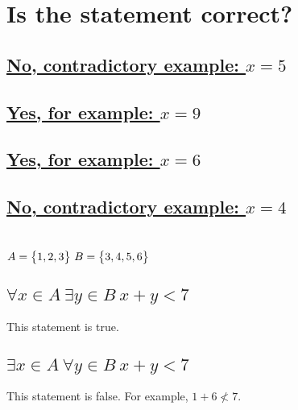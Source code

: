 \documentclass[a4paper, 12pt]{article}
\newcommand{\sub}[1]{\subsection{\underline{#1}}}
\newcommand{\?}{\stackrel{?}{=}}
\begin{document}
\section{Is the statement correct?}
\sub{No, contradictory example: $x=5$}
\sub{Yes, for example: $x=9$}
\sub{Yes, for example: $x=6$}
\sub{No, contradictory example: $x=4$}
\pagebreak

\section{$A=\big{\{} 1,2,3 \big{\}} ~B=\big{\{}3,4,5,6 \big{\}}$}
\sub{$\forall{x}\in{A}~\exists{y}\in{B}~ x+y<7$}
This statement is true.

\sub{$\exists{x}\in{A}~\forall{y}\in{B}~ x+y<7$}
This statement is false.
For example, $1+6\not<7$.

\end{document}
